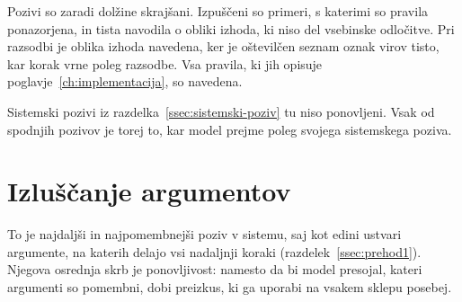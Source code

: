 \documentclass[a4paper, 12pt]{book}
\begin{document}
Pozivi so zaradi dolžine skrajšani. Izpuščeni so primeri, s katerimi so pravila
ponazorjena, in tista navodila o obliki izhoda, ki niso del vsebinske odločitve.
Pri razsodbi je oblika izhoda navedena, ker je oštevilčen seznam oznak virov
tisto, kar korak vrne poleg razsodbe. Vsa pravila, ki jih opisuje
poglavje~\ref{ch:implementacija}, so navedena.

Sistemski pozivi iz razdelka~\ref{ssec:sistemski-poziv} tu niso ponovljeni.
Vsak od spodnjih pozivov je torej to, kar model prejme poleg svojega
sistemskega poziva.

\section{Izluščanje argumentov}
\label{app:poziv-izluscanje}

To je najdaljši in najpomembnejši poziv v sistemu, saj kot edini ustvari
argumente, na katerih delajo vsi nadaljnji koraki
(razdelek~\ref{ssec:prehod1}). Njegova osrednja skrb je ponovljivost: namesto da
bi model presojal, kateri argumenti so pomembni, dobi preizkus, ki ga uporabi na
vsakem sklepu posebej.
\end{document}
